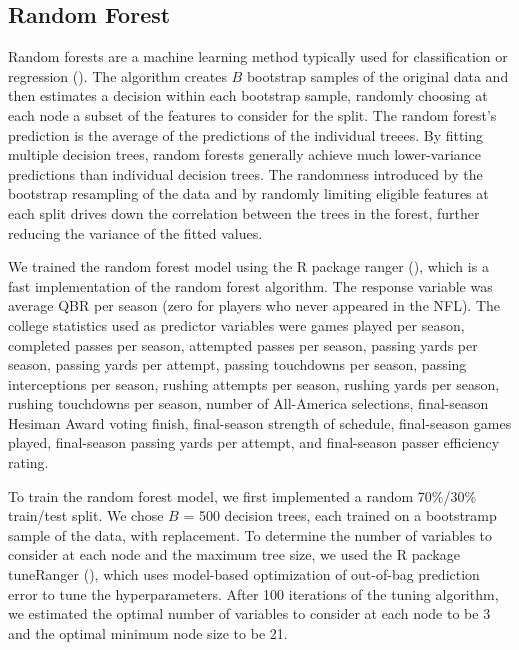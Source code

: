 \documentclass[Review, sageh, times]{sagej}
\begin{document}
\subsection{Random Forest}
Random forests are a machine learning method typically used for classification or regression (\cite{breiman_random_2001}). The algorithm creates $B$ bootstrap samples of the original data and then estimates a decision within each bootstrap sample, randomly choosing at each node a subset of the features to consider for the split. The random forest's prediction is the average of the predictions of the individual treees. By fitting multiple decision trees, random forests generally achieve much lower-variance predictions than individual decision trees. The randomness introduced by the bootstrap resampling of the data and by randomly limiting eligible features at each split drives down the correlation between the trees in the forest, further reducing the variance of the fitted values.

We trained the random forest model using the R package ranger (\cite{wright_ranger_2015}), which is a fast implementation of the random forest algorithm. The response variable was average QBR per season (zero for players who never appeared in the NFL). The college statistics used as predictor variables were games played per season, completed passes per season, attempted passes per season, passing yards per season, passing yards per attempt, passing touchdowns per season, passing interceptions per season, rushing attempts per season, rushing yards per season, rushing touchdowns per season, number of All-America selections, final-season Hesiman Award voting finish, final-season strength of schedule, final-season games played, final-season passing yards per attempt, and final-season passer efficiency rating.

To train the random forest model, we first implemented a random 70\%/30\% train/test split. We chose $B$ = 500 decision trees, each trained on a bootstramp sample of the data, with replacement. To determine the number of variables to consider at each node and the maximum tree size, we used the R package tuneRanger (\cite{probst_tuneranger_2018}), which uses model-based optimization of out-of-bag prediction error to tune the hyperparameters. After 100 iterations of the tuning algorithm, we estimated the optimal number of variables to consider at each node to be 3 and the optimal minimum node size to be 21.
\end{document}
